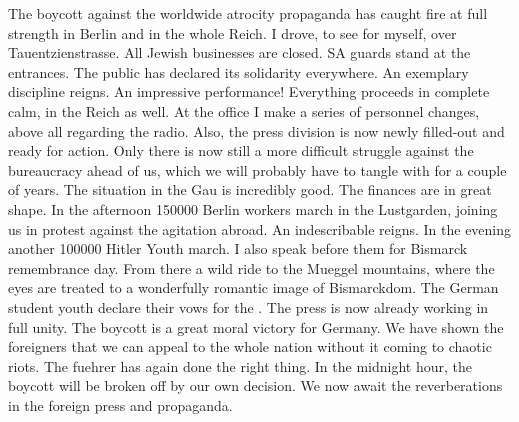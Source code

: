 The boycott against the worldwide atrocity propaganda has caught fire at full strength in Berlin and in the whole Reich. I drove, to see for myself, over Tauentzienstrasse. All Jewish businesses are closed. SA guards stand at the entrances. The public has declared its solidarity everywhere. An exemplary discipline reigns. An impressive performance! Everything proceeds in complete calm, in the Reich as well. At the office I make a series of personnel changes, above all regarding the radio. Also, the press division is now newly filled-out and ready for action. Only there is now still a more difficult struggle against the bureaucracy ahead of us, which we will probably have to tangle with for a couple of years.  The situation in the Gau is incredibly good. The finances are in great shape. In the afternoon 150000 Berlin workers march in the Lustgarden, joining us in protest against the agitation abroad. An indescribable  reigns. In the evening another 100000 Hitler Youth march. I also speak before them for Bismarck remembrance day. From there a wild ride to the Mueggel mountains, where the eyes are treated to a wonderfully romantic image of Bismarckdom. The German student youth declare their vows for the . The press is now already working in full unity. The boycott is a great moral victory for Germany. We have shown the foreigners that we can appeal to the whole nation without it coming to chaotic riots. The fuehrer has again done the right thing. In the midnight hour, the boycott will be broken off by our own decision. We now await the reverberations in the foreign press and propaganda.